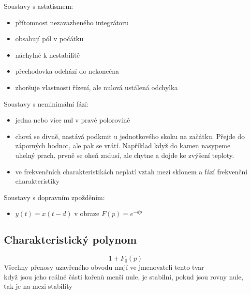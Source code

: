 Soustavy s astatismem:
\begin{itemize}
    \item přítomnost nezavazbeného integrátoru
    \item obsahují pól v počátku
    \item náchylné k nestabilitě
    \item přechodovka odchází do nekonečna
    \item zhoršuje vlastnosti řízení, ale nulová ustálená odchylka
\end{itemize}

Soustavy s neminimální fází:
\begin{itemize}
    \item jedna nebo více nul v pravé polorovině
    \item chová se divně, nastává podkmit u jednotkového skoku na začátku. Přejde do záporných hodnot, ale pak se vrátí. Například když do kamen nasypeme uhelný prach, prvně se oheň zadusí, ale chytne a dojde ke zvýšení teploty.
    \item ve frekvenčních charakteristikách neplatí vztah mezi sklonem a fází frekvenční charakteristiky
\end{itemize}

Soustavy s dopravním zpožděním:
\begin{itemize}
    \item $y(t) = x(t-d)$ v obraze $F(p) = e^{-dp}$
\end{itemize}
\newpage

\subsection*{Charakteristický polynom}
\begin{equation}
    1+F_0(p)
\end{equation}
Všechny přenosy uzavřeného obvodu mají ve jmenovateli tento tvar\\
když jsou jeho reálné části kořenů menší nule, je stabilní, pokud jsou rovny nule, tak je na mezi stability\\
